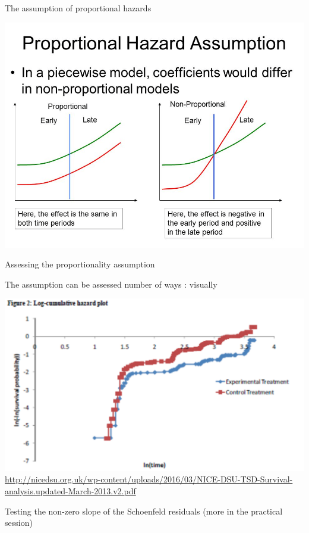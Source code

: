 \documentclass[
  ignorenonframetext,
]{beamer}
\begin{document}
\begin{frame}{The assumption of proportional hazards}
\protect\hypertarget{the-assumption-of-proportional-hazards}{}

\includegraphics[width=1\linewidth]{figures/Churn}

\end{frame}

\begin{frame}{Assessing the proportionality assumption}
\protect\hypertarget{assessing-the-proportionality-assumption}{}

The assumption can be assessed number of ways : visually

\includegraphics[width=1\linewidth]{figures/prop}
\url{http://nicedsu.org.uk/wp-content/uploads/2016/03/NICE-DSU-TSD-Survival-analysis.updated-March-2013.v2.pdf}

Testing the non-zero slope of the Schoenfeld residuals (more in the
practical session)

\end{frame}
\end{document}
